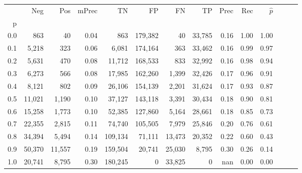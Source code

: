 \begin{tabular}{rrrrrrrrrrrrrr}
\toprule
{} &     Neg &     Pos & mPrec &       TN &       FP &      FN &      TP &  Prec &   Rec & $\hat{p}$ \\
p   &         &         &       &          &          &         &         &       &       &           \\
\midrule
0.0 &     863 &      40 &  0.04 &      863 &  179,382 &      40 &  33,785 &  0.16 &  1.00 &      1.00 \\
0.1 &   5,218 &     323 &  0.06 &    6,081 &  174,164 &     363 &  33,462 &  0.16 &  0.99 &      0.97 \\
0.2 &   5,631 &     470 &  0.08 &   11,712 &  168,533 &     833 &  32,992 &  0.16 &  0.98 &      0.94 \\
0.3 &   6,273 &     566 &  0.08 &   17,985 &  162,260 &   1,399 &  32,426 &  0.17 &  0.96 &      0.91 \\
0.4 &   8,121 &     802 &  0.09 &   26,106 &  154,139 &   2,201 &  31,624 &  0.17 &  0.93 &      0.87 \\
0.5 &  11,021 &   1,190 &  0.10 &   37,127 &  143,118 &   3,391 &  30,434 &  0.18 &  0.90 &      0.81 \\
0.6 &  15,258 &   1,773 &  0.10 &   52,385 &  127,860 &   5,164 &  28,661 &  0.18 &  0.85 &      0.73 \\
0.7 &  22,355 &   2,815 &  0.11 &   74,740 &  105,505 &   7,979 &  25,846 &  0.20 &  0.76 &      0.61 \\
0.8 &  34,394 &   5,494 &  0.14 &  109,134 &   71,111 &  13,473 &  20,352 &  0.22 &  0.60 &      0.43 \\
0.9 &  50,370 &  11,557 &  0.19 &  159,504 &   20,741 &  25,030 &   8,795 &  0.30 &  0.26 &      0.14 \\
1.0 &  20,741 &   8,795 &  0.30 &  180,245 &        0 &  33,825 &       0 &   nan &  0.00 &      0.00 \\
\bottomrule
\end{tabular}
